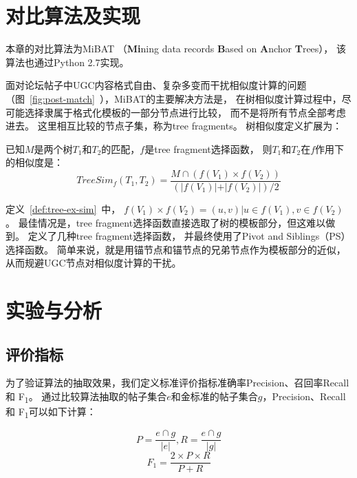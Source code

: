 \section{对比算法及实现}
\label{sec:pean-other}

本章的对比算法为MiBAT
（\textbf{Mi}ning data records 
\textbf{B}ased on \textbf{A}nchor \textbf{T}rees），
该算法也通过Python 2.7实现。

面对论坛帖子中UGC内容格式自由、复杂多变而干扰相似度计算的问题
（图~\ref{fig:post-match}~），MiBAT的主要解决方法是，
在树相似度计算过程中，尽可能选择隶属于格式化模板的一部分节点进行比较，
而不是将所有节点全部考虑进去。
这里相互比较的节点子集，称为tree fragments。
树相似度定义扩展为：

\begin{definition}
\label{def:tree-ex-sim}
已知$M$是两个树$T_1$和$T_2$的匹配，$f$是tree fragment选择函数，
则$T_1$和$T_2$在$f$作用下的相似度是：
\begin{equation}
TreeSim_f(T_1, T_2) = \frac{M \cap (f(V_1) \times f(V_2))}
{(\vert f(V_1) \vert + \vert f(V_2) \vert) / 2}
\end{equation}
\end{definition}

定义~\ref{def:tree-ex-sim}~中，
$f(V_1) \times f(V_2) = {(u,v) \vert u \in f(V_1), v \in f(V_2)}$。
最佳情况是，tree fragment选择函数直接选取了树的模板部分，但这难以做到。
\cite{song2010automatic}定义了几种tree fragment选择函数，
并最终使用了Pivot and Siblings（PS）选择函数。
简单来说，就是用锚节点和锚节点的兄弟节点作为模板部分的近似，
从而规避UGC节点对相似度计算的干扰。

\section{实验与分析}
\label{sec:pean-experiment}

\subsection{评价指标}
为了验证算法的抽取效果，我们定义标准评价指标准确率Precision、召回率Recall和
F\textsubscript{1}。
通过比较算法抽取的帖子集合$e$和金标准的帖子集合$g$，Precision、Recall和
F\textsubscript{1}可以如下计算：

\begin{equation}
P = \frac{e \cap g}{\vert e \vert}, R = \frac{e \cap g}{\vert g \vert}
\end{equation}
\begin{equation}
F_1 = \frac{2 \times P \times R}{P + R}
\end{equation}

